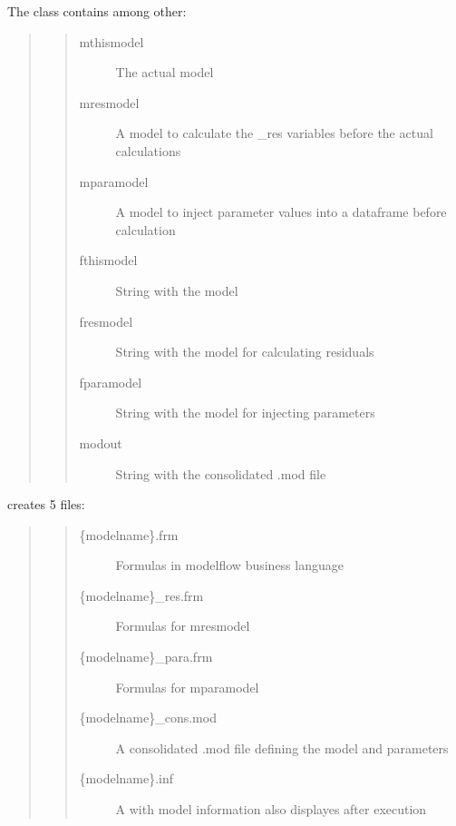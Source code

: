 \documentclass[letterpaper,10pt,english]{sphinxmanual}
\begin{document}
\begin{fulllineitems}
\sphinxAtStartPar
The class contains among other:
\begin{quote}
\begin{quote}\begin{description}
\item[{mthismodel}] \leavevmode
\sphinxAtStartPar
The actual model

\item[{mresmodel}] \leavevmode
\sphinxAtStartPar
A model to calculate the \_res variables before the actual calculations

\item[{mparamodel}] \leavevmode
\sphinxAtStartPar
A model to inject parameter values into a dataframe before calculation

\item[{fthismodel}] \leavevmode
\sphinxAtStartPar
String with the model

\item[{fresmodel}] \leavevmode
\sphinxAtStartPar
String with the model for calculating residuals

\item[{fparamodel}] \leavevmode
\sphinxAtStartPar
String with the model for injecting parameters

\item[{modout}] \leavevmode
\sphinxAtStartPar
String with the consolidated .mod file

\end{description}\end{quote}
\end{quote}

\sphinxAtStartPar
creates 5 files:
\begin{quote}
\begin{quote}\begin{description}
\item[{\{modelname\}.frm}] \leavevmode
\sphinxAtStartPar
Formulas in modelflow business language

\item[{\{modelname\}\_res.frm}] \leavevmode
\sphinxAtStartPar
Formulas for mresmodel

\item[{\{modelname\}\_para.frm}] \leavevmode
\sphinxAtStartPar
Formulas for mparamodel

\item[{\{modelname\}\_cons.mod}] \leavevmode
\sphinxAtStartPar
A consolidated .mod file defining the model and parameters

\item[{\{modelname\}.inf}] \leavevmode
\sphinxAtStartPar
A with model information \sphinxhyphen{} also displayes after execution

\end{description}\end{quote}
\end{quote}

\end{fulllineitems}
\end{document}
